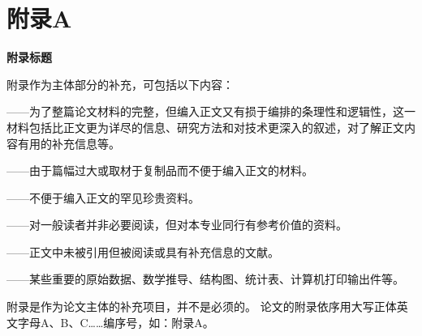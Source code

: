 

\chapter{附录A}

\begin{center}
\textbf{附录标题}
\end{center}



\indent
{}
附录作为主体部分的补充，可包括以下内容：

——为了整篇论文材料的完整，但编入正文又有损于编排的条理性和逻辑性，这一材料包括比正文更为详尽的信息、研究方法和对技术更深入的叙述，对了解正文内容有用的补充信息等。

——由于篇幅过大或取材于复制品而不便于编入正文的材料。

——不便于编入正文的罕见珍贵资料。

——对一般读者并非必要阅读，但对本专业同行有参考价值的资料。

——正文中未被引用但被阅读或具有补充信息的文献。

——某些重要的原始数据、数学推导、结构图、统计表、计算机打印输出件等。


附录是作为论文主体的补充项目，并不是必须的。
论文的附录依序用大写正体英文字母A、B、C……编序号，如：附录A。